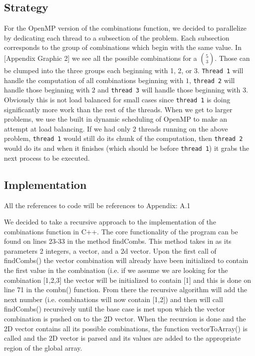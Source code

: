 \documentclass[titlepage, 11pt]{article}
\begin{document}
\subsection{Strategy}
For the OpenMP version of the combinations function, we decided to parallelize by dedicating each thread to a subsection of the problem. Each subsection corresponds to the group of combinations which begin with the same value. In [Appendix Graphic 2] we see all the possible combinations for a ${5 \choose 3}$. Those can be clumped into the three groups each beginning with 1, 2, or 3. \verb;Thread 1; will handle the computation of all combinations beginning with $1$, \verb;thread 2; will handle those beginning with $2$ and \verb;thread 3; will handle those beginning with $3$. Obviously this is not load balanced for small cases since \verb;thread 1; is doing significantly more work than the rest of the threads. When we get to larger problems, we use the built in dynamic scheduling of OpenMP to make an attempt at load balancing. If we had only 2 threads running on the above problem, \verb;thread 1; would still do its chunk of the computation, then \verb;thread 2; would do its and when it finishes (which should be before \verb;thread 1;) it grabs the next process to be executed.



\subsection{Implementation}

\begin{center}\textcolor{black!50}{All the references to code will be references to Appendix: A.1}\\ \end{center}
We decided to take a recursive approach to the implementation of the combinations function in C++. The core functionality of the program can be found on lines 23-33 in the method findCombs. This method takes in as its parameters 2 integers, a vector, and a 2d vector. Upon the first call of findCombs() the vector combination will already have been initialized to contain the first value in the combination (i.e. if we assume we are looking for the combination [1,2,3] the vector will be initialized to contain [1] and this is done on line 71 in the combn() function. From there the recursive algorithm will add the next number (i.e. combinations will now contain [1,2]) and then will call findCombs() recursively until the base case is met upon which the vector combination is pushed on to the 2D vector. When the recursion is done and the 2D vector contains all its possible combinations, the function vectorToArray() is called and the 2D vector is parsed and its values are added to the appropriate region of the global array. 
\end{document}

